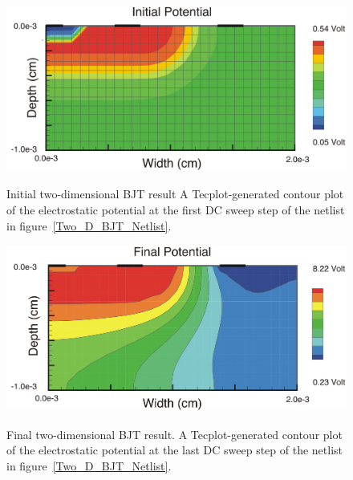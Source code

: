 \begin{figure}
  \centering
  \scalebox{1.0}
  {\includegraphics[width=4.610in,height= 2.165in]{twoDresultA}}
  \caption[Initial two-dimensional BJT result]
  {Initial two-dimensional BJT result
A Tecplot-generated contour plot of the electrostatic potential at the first DC 
  sweep step of the netlist in figure~\ref{Two_D_BJT_Netlist}.  
\label{twoD_BJTResA}}
\end{figure}

\begin{figure}
  \centering
  \scalebox{1.0}
  {\includegraphics[width=4.610in,height= 2.165in]{twoDresultB}}
  \caption[Final two-dimensional BJT result.]
  {Final two-dimensional BJT result.  
A Tecplot-generated contour plot of the electrostatic potential at the last DC sweep 
  step of the netlist in figure~\ref{Two_D_BJT_Netlist}.  
\label{twoD_BJTResB}}
\end{figure}


